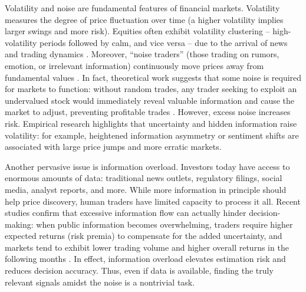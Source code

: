 Volatility and noise are fundamental features of financial markets. Volatility measures the degree of price fluctuation over time (a higher volatility implies larger swings and more risk). Equities often exhibit volatility clustering – high-volatility periods followed by calm, and vice versa – due to the arrival of news and trading dynamics \cite{Robert1982}. Moreover, “noise traders” (those trading on rumors, emotion, or irrelevant information) continuously move prices away from fundamental values \cite{DeLong1990}. In fact, theoretical work suggests that some noise is required for markets to function: without random trades, any trader seeking to exploit an undervalued stock would immediately reveal valuable information and cause the market to adjust, preventing profitable trades \cite{Grossman1980}. However, excess noise increases risk. Empirical research highlights that uncertainty and hidden information raise volatility: for example, heightened information asymmetry or sentiment shifts are associated with large price jumps and more erratic markets.

Another pervasive issue is information overload. Investors today have access to enormous amounts of data: traditional news outlets, regulatory filings, social media, analyst reports, and more. While more information in principle should help price discovery, human traders have limited capacity to process it all. Recent studies confirm that excessive information flow can actually hinder decision-making: when public information becomes overwhelming, traders require higher expected returns (risk premia) to compensate for the added uncertainty, and markets tend to exhibit lower trading volume and higher overall returns in the following months \cite{Bernales2023}. In effect, information overload elevates estimation risk and reduces decision accuracy. Thus, even if data is available, finding the truly relevant signals amidst the noise is a nontrivial task.

